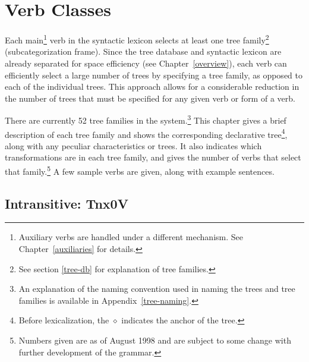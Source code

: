 
\chapter{Verb Classes}
\label{verb-classes}

Each main\footnote{Auxiliary verbs are handled under a different
mechanism.  See Chapter~\ref{auxiliaries} for details.} verb in the
syntactic lexicon selects at least one tree family\footnote{See
section \ref{tree-db} for explanation of tree families.}
(subcategorization frame).  Since the tree database and syntactic
lexicon are already separated for space efficiency (see
Chapter~\ref{overview}), each verb can efficiently select a large
number of trees by specifying a tree family, as opposed to each of the
individual trees.  This approach allows for a considerable reduction
in the number of trees that must be specified for any given verb or
form of a verb.

There are currently 52 tree families in the system.\footnote{An
  explanation of the naming convention used in naming the trees and
  tree families is available in Appendix~\ref{tree-naming}.}  This
chapter gives a brief description of each tree family and shows the
corresponding declarative tree\footnote{Before lexicalization, the
  $\diamond$ indicates the anchor of the tree.}, along with any
peculiar characteristics or trees.  It also indicates which
transformations are in each tree family, and gives the number of verbs
that select that family.\footnote{Numbers given are as of August 1998
  and are subject to some change with further development of the
  grammar.} A few sample verbs are given, along with example
sentences.


\section{Intransitive: Tnx0V}
\label{nx0V-family}

